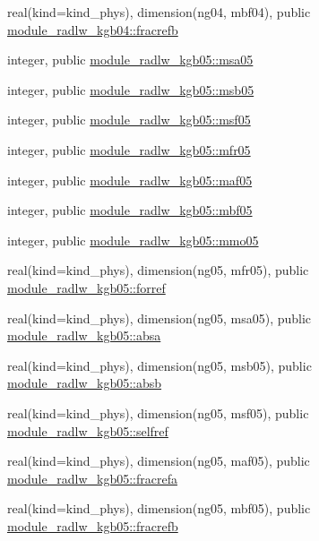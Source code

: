 \begin{DoxyCompactItemize}
real(kind=kind\+\_\+phys), dimension(ng04, mbf04), public \hyperlink{namespacemodule__radlw__kgb04_ae8d5d56d09dfbe06d918c6b098e3fddf}{module\+\_\+radlw\+\_\+kgb04\+::fracrefb}
\item 
integer, public \hyperlink{namespacemodule__radlw__kgb05_a79c5177c6d0e56a69f4d1a0704879539}{module\+\_\+radlw\+\_\+kgb05\+::msa05}
\item 
integer, public \hyperlink{namespacemodule__radlw__kgb05_a0f3b6573bfe94c5a5968cda2dc8b1adf}{module\+\_\+radlw\+\_\+kgb05\+::msb05}
\item 
integer, public \hyperlink{namespacemodule__radlw__kgb05_a1c9a43b7011e7328fa62d3ecd29acc73}{module\+\_\+radlw\+\_\+kgb05\+::msf05}
\item 
integer, public \hyperlink{namespacemodule__radlw__kgb05_a44f07da9a7f99377f7d331249c475b80}{module\+\_\+radlw\+\_\+kgb05\+::mfr05}
\item 
integer, public \hyperlink{namespacemodule__radlw__kgb05_aba904215976d7f4316b52c8f0cffe595}{module\+\_\+radlw\+\_\+kgb05\+::maf05}
\item 
integer, public \hyperlink{namespacemodule__radlw__kgb05_a57db9a9cb9acac604df555038f6127a3}{module\+\_\+radlw\+\_\+kgb05\+::mbf05}
\item 
integer, public \hyperlink{namespacemodule__radlw__kgb05_aa552aae4878030144218ca6c2bbe417f}{module\+\_\+radlw\+\_\+kgb05\+::mmo05}
\item 
real(kind=kind\+\_\+phys), dimension(ng05, mfr05), public \hyperlink{namespacemodule__radlw__kgb05_a6ff0c311db14b41c9bdf1170164adc3a}{module\+\_\+radlw\+\_\+kgb05\+::forref}
\item 
real(kind=kind\+\_\+phys), dimension(ng05, msa05), public \hyperlink{namespacemodule__radlw__kgb05_a30ce809b40dd99b3219996ac8f023274}{module\+\_\+radlw\+\_\+kgb05\+::absa}
\item 
real(kind=kind\+\_\+phys), dimension(ng05, msb05), public \hyperlink{namespacemodule__radlw__kgb05_aebc667b0569824bba455e822eaea6112}{module\+\_\+radlw\+\_\+kgb05\+::absb}
\item 
real(kind=kind\+\_\+phys), dimension(ng05, msf05), public \hyperlink{namespacemodule__radlw__kgb05_a3c727eabe159c88fca912f33a2b91943}{module\+\_\+radlw\+\_\+kgb05\+::selfref}
\item 
real(kind=kind\+\_\+phys), dimension(ng05, maf05), public \hyperlink{namespacemodule__radlw__kgb05_a335fd60e59154f47724d2e25fdf0a5fb}{module\+\_\+radlw\+\_\+kgb05\+::fracrefa}
\item 
real(kind=kind\+\_\+phys), dimension(ng05, mbf05), public \hyperlink{namespacemodule__radlw__kgb05_af7b1fd9c6b966e03a226dd8cbc058670}{module\+\_\+radlw\+\_\+kgb05\+::fracrefb}

\end{DoxyCompactItemize}
